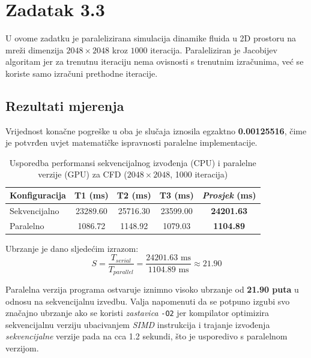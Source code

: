 \documentclass[12pt,a4paper]{article}
\begin{document}
\section{Zadatak 3.3}

U ovome zadatku je paralelizirana simulacija dinamike fluida u 2D prostoru
na mreži dimenzija $2048 \times 2048$ kroz $1000$ iteracija.
Paraleliziran je Jacobijev algoritam jer za trenutnu iteraciju nema ovisnosti s trenutnim
izračunima, već se koriste samo izračuni prethodne iteracije.


\subsection{Rezultati mjerenja}
Vrijednost konačne pogreške u oba je slučaja iznosila egzaktno \textbf{0.00125516},
čime je potvrđen uvjet matematičke ispravnosti paralelne implementacije.

\begin{table}[ht!]
\centering
\caption{Usporedba performansi sekvencijalnog izvođenja (CPU) i paralelne verzije (GPU) za CFD ($2048 \times 2048$, 1000 iteracija)}
\label{tab:cfd_rezultati}
\vspace{0.3cm}
\begin{tabular}{lcccc}
\toprule
\textbf{Konfiguracija} & \textbf{T1 (ms)} & \textbf{T2 (ms)} & \textbf{T3 (ms)} & \textbf{\textit{Prosjek} (ms)} \\
\midrule
Sekvencijalno  & 23289.60 & 25716.30 & 23599.00 & \textbf{24201.63} \\
Paralelno     & 1086.72  & 1148.92  & 1079.03  & \textbf{1104.89}  \\
\bottomrule
\end{tabular}
\end{table}

\noindent Ubrzanje je dano sljedećim izrazom:
\begin{equation}
    S = \frac{T_{serial}}{T_{parallel}} = \frac{24201.63 \text{ ms}}{1104.89 \text{ ms}} \approx \mathbf{21.90}
\end{equation}

\noindent Paralelna verzija programa ostvaruje iznimno visoko ubrzanje od \textbf{21.90 puta}
u odnosu na sekvencijalnu izvedbu. Valja napomenuti da se potpuno izgubi svo značajno ubrzanje ako se
koristi \textit{zastavica} \texttt{-O2} jer kompilator optimizira sekvencijalnu verziju ubacivanjem
\textit{SIMD} instrukcija i trajanje izvođenja \textit{sekvencijalne} verzije pada na cca 1.2
sekundi, što je usporedivo s paralelnom verzijom.
\end{document}
